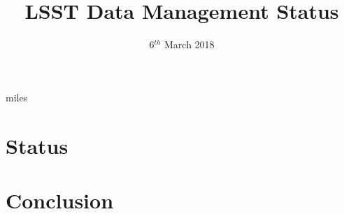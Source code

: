 


\title{LSST Data Management Status  }
\date{ 6$^{th}$ March 2018}


\graphicspath{{./figures} {./images/}{../../dm-docs/images/} }





\maketitle


 {miles}


\section{Status }








\section{Conclusion}


\appendix



